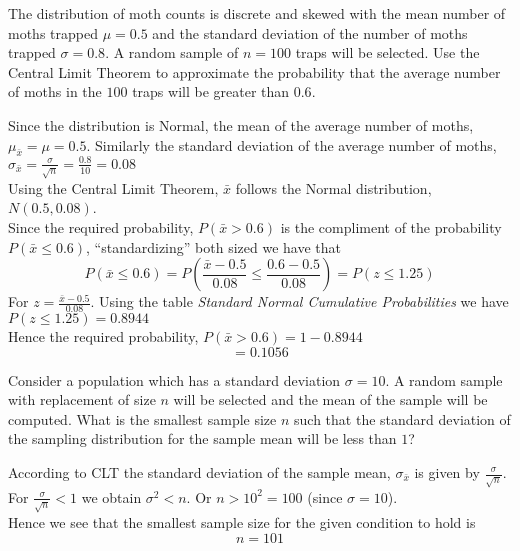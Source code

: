\documentclass[boxes, qed]{homework}
\begin{document}
\newenvironment{amatrix}[1]{%
  \left[\begin{array}{@{}*{#1}{c}|c@{}}
}{%
  \end{array}\right]
}

\newenvironment{augmatrix}[1]{%
  \left[\begin{array}{#1}
}{%
  \end{array}\right]
}

\begin{problem}The distribution of moth counts is discrete and skewed with the mean number of moths
  trapped $\mu=0.5$ and the standard deviation of the number of moths trapped $\sigma=0.8$. A random
  sample of $n=100$ traps will be selected. Use the Central Limit Theorem to approximate the probability that
  the average number of moths in the $100$ traps will be greater than $0.6$.
\end{problem}
\begin{solution}Since the distribution is Normal,
  the mean of the average number of moths, 
  $\mu_{\bar{x}}=\mu=0.5$. Similarly the standard
  deviation of the average number of moths, 
  $\sigma_{\bar{x}}=\frac{\sigma}{\sqrt{n}}=\frac{0.8}{10}=0.08$\\

  Using the Central Limit Theorem, $\bar{x}$ follows the Normal
  distribution, $N(0.5, 0.08)$.\\

  Since the required probability, 
  $P(\bar{x}>0.6)$ is the compliment of the probability
  $P(\bar{x}\le{0.6})$, ``standardizing'' both sized we have that
  $$
  P(\bar{x}\le{0.6}) 
  = P(\frac{\bar{x}-0.5}{0.08}\le{\frac{0.6-0.5}{0.08}})
  = P(z\le{1.25})
  $$
  For $z=\frac{\bar{x}-0.5}{0.08}$. Using the table \textit{Standard Normal Cumulative Probabilities}
  we have $P(z\le{1.25})=0.8944$\\

  Hence the required probability, $P(\bar{x}>0.6)=1-0.8944$
  $$=\boxed{0.1056}$$
\end{solution}

\begin{problem}Consider a population which has a standard deviation $\sigma=10$. 
  A random sample with replacement of size $n$ will be selected and 
  the mean of the sample will be computed. What is the smallest
  sample size $n$ such that the standard deviation of the sampling 
  distribution for the sample mean will be less than $1$?
\end{problem}
\begin{solution}According to CLT 
  the standard deviation of the sample mean, $\sigma_{\bar{x}}$
  is given by $\frac{\sigma}{\sqrt{n}}$.\\

  For $\frac{\sigma}{\sqrt{n}}<1$ we obtain $\sigma^2<n$.
  Or $n>10^2=100$ (since $\sigma=10$).\\

  Hence we see that the smallest sample size for the given condition
  to hold is
  $$\boxed{n=101}$$
\end{solution}
\end{document}
